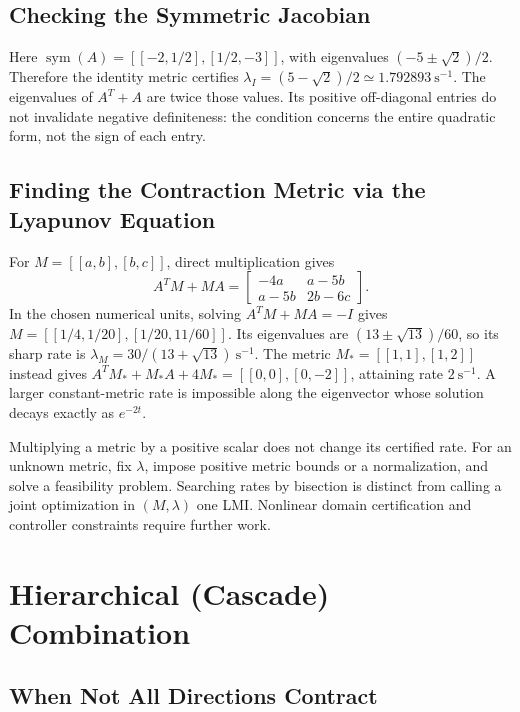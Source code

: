 \subsection{Checking the Symmetric Jacobian}

Here $\operatorname{sym}(A)=[[-2,1/2],[1/2,-3]]$, with eigenvalues $(-5\pm\sqrt2)/2$. Therefore the identity metric certifies
$\lambda_I=(5-\sqrt2)/2\simeq1.792893\ \mathrm{s}^{-1}$.
The eigenvalues of $A^T+A$ are twice those values. Its positive off-diagonal entries do not invalidate negative definiteness: the condition concerns the entire quadratic form, not the sign of each entry.

\subsection{Finding the Contraction Metric via the Lyapunov Equation}

For $M=[[a,b],[b,c]]$, direct multiplication gives
\begin{equation}
A^TM+MA=\begin{bmatrix}-4a&a-5b\\a-5b&2b-6c\end{bmatrix}.
\end{equation}
In the chosen numerical units, solving $A^TM+MA=-I$ gives
$M=[[1/4,1/20],[1/20,11/60]]$.
Its eigenvalues are $(13\pm\sqrt{13})/60$, so its sharp rate is
$\lambda_M=30/(13+\sqrt{13})\ \mathrm{s}^{-1}$.
The metric $M_*=[[1,1],[1,2]]$ instead gives $A^TM_*+M_*A+4M_*=[[0,0],[0,-2]]$, attaining rate $2\ \mathrm{s}^{-1}$. A larger constant-metric rate is impossible along the eigenvector whose solution decays exactly as $e^{-2t}$.

Multiplying a metric by a positive scalar does not change its certified rate. For an unknown metric, fix $\lambda$, impose positive metric bounds or a normalization, and solve a feasibility problem. Searching rates by bisection is distinct from calling a joint optimization in $(M,\lambda)$ one LMI. Nonlinear domain certification and controller constraints require further work.

\section{Hierarchical (Cascade) Combination}
\label{sec:ch4:cascade}

\subsection{When Not All Directions Contract}

